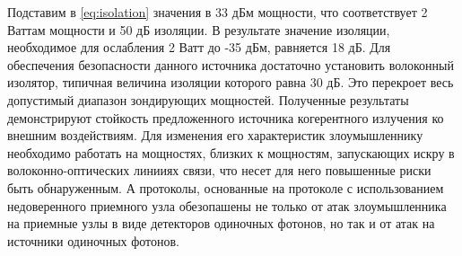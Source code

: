 Подставим в \ref{eq:isolation} значения в 33 дБм мощности, что соответствует 2 Ваттам мощности и 50 дБ изоляции. В результате значение изоляции, необходимое для ослабления 2 Ватт до -35 дБм, равняется 18 дБ. Для обеспечения безопасности данного источника достаточно установить волоконный изолятор, типичная величина изоляции которого равна 30 дБ. Это перекроет весь допустимый диапазон зондирующих мощностей. 
\newline Полученные результаты демонстрируют стойкость предложенного источника когерентного излучения ко внешним воздействиям. Для изменения его характеристик злоумышленнику необходимо работать на мощностях, близких к мощностям, запускающих искру в волоконно-оптических линииях связи, что несет для него повышенные риски быть обнаруженным. А протоколы, основанные на протоколе с использованием недоверенного приемного узла обезопашены не только от атак злоумышленника на приемные узлы в виде детекторов одиночных фотонов, но так и от атак на источники одиночных фотонов. 